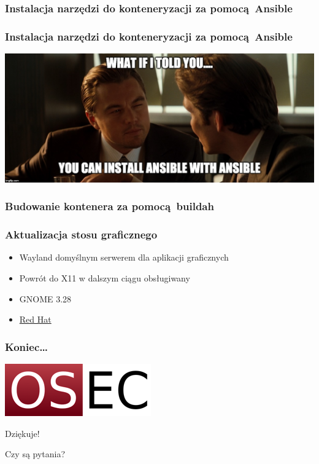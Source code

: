 \documentclass[dvipsnames,table]{beamer}
\begin{document}
\begin{frame}[fragile]
	\frametitle{Instalacja narzędzi do konteneryzacji za pomocą Ansible}
	
\end{frame}

\begin{frame}[fragile]
	\frametitle{Instalacja narzędzi do konteneryzacji za pomocą Ansible}
\begin{center}
\includegraphics[scale=0.13]{img-ansibleinception.jpg}
\end{center}

\end{frame}

\begin{frame}[fragile]
	\frametitle{Budowanie kontenera za pomocą buildah}

\end{frame}

\begin{frame}[fragile]
	\frametitle{Aktualizacja stosu graficznego}
\begin{itemize}
	\item{Wayland domyślnym serwerem dla aplikacji graficznych}
	\item{Powrót do X11 w dalszym ciągu obsługiwany}
	\item{GNOME 3.28}
	\item \href{http://www.redhat.com}{Red Hat}
\end{itemize}
\end{frame}

\begin{frame}
\frametitle{Koniec\ldots}
\begin{center}
\includegraphics[scale=0.5]{img-oseclogo.png}

Dziękuje!

Czy są pytania?

\end{center}
\end{frame}
\end{document}
